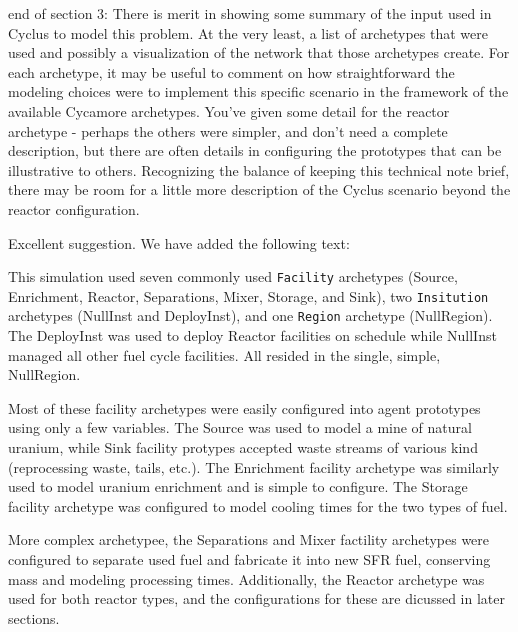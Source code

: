 \documentclass[answers,11pt]{exam}
\begin{document}
\begin{questions}
        \question end of section 3: There is merit in showing some summary of 
        the input used in Cyclus to model this problem.  At the very least, a 
        list of archetypes that were used and possibly a visualization of the 
        network that those archetypes create.  For each archetype, it may be 
        useful to comment on how straightforward the modeling choices were to 
        implement this specific scenario in the framework of the available 
        Cycamore archetypes.  You've given some detail for the reactor 
        archetype - perhaps the others were simpler, and don't need a complete 
        description, but there are often details in configuring the prototypes 
        that can be illustrative to others.  Recognizing the balance of keeping 
        this technical note brief, there may be room for a little more 
        description of the Cyclus scenario beyond the reactor configuration.

        \begin{solution}
                Excellent suggestion. We have added the following text:


                This simulation used seven commonly used \Cycamore \texttt{Facility} archetypes
(Source, Enrichment, Reactor, Separations, Mixer, Storage, and Sink), two
\texttt{Insitution} archetypes (NullInst and DeployInst), and one
\texttt{Region} archetype (NullRegion).
The DeployInst was used to deploy Reactor facilities on
schedule while NullInst managed all other fuel cycle facilities. All resided in
the single, simple, NullRegion.

Most of these facility archetypes were easily configured into agent prototypes
using only a few variables. The Source was used to model a mine of natural
uranium, while Sink facility protypes accepted waste streams of various kind
(reprocessing waste, tails, etc.). The Enrichment facility archetype was
similarly used to model uranium enrichment and is simple to configure. The
Storage facility archetype was configured to model cooling times for the two
types of fuel.

More complex archetypee, the Separations and Mixer factility archetypes were
configured to separate used fuel and fabricate it into new SFR fuel, conserving
mass and modeling processing times. Additionally, the Reactor archetype was
used for both reactor types, and the configurations for these are dicussed in later
sections.
        \end{solution}


\end{questions}
\end{document}
